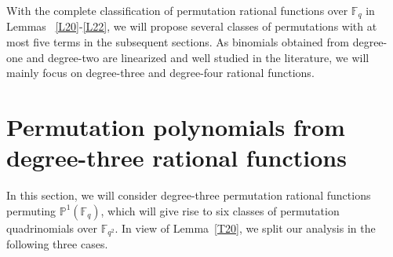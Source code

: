 \documentclass[12pt]{amsart}
\numberwithin{equation}{section}
\theoremstyle{definition}
\newcommand{\F}{\mathbb F}
\newcommand{\bP}{\mathbb P}
\begin{document}
With the complete classification of permutation rational functions over $\F_q$ in Lemmas ~\ref{L20}-\ref{L22}, we will propose several classes of permutations with at most five terms in the subsequent sections.
As binomials obtained from degree-one and degree-two are linearized and well studied in the literature, we will mainly focus on degree-three and degree-four rational functions.

\section{Permutation polynomials from degree-three rational functions} \label{S3}
In this section, we will consider degree-three permutation rational functions permuting $\bP^1(\F_q)$, which will give rise to six classes of permutation quadrinomials over $\F_{q^2}$.
In view of Lemma~\ref{T20}, we split our analysis in the following  three cases.
\end{document}
